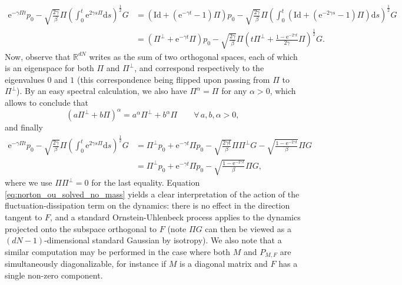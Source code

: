 \documentclass[a4paper,10pt,twoside,leqno]{report}
\newcommand{\R}{\mathbb{R}}
\newcommand{\Id}{\mathrm{Id}}
\newcommand{\dif}{\mathrm{d}}
\newcommand{\1}{\mathbbm{1}}
\newcommand{\e}{\mathrm{e}}
\begin{document}
    \begin{equation}
        \begin{aligned}
            \mathrm{e}^{-\gamma \Pi t}p_0-\sqrt{\frac{2\gamma}{\beta}} \Pi\left(\int_0^t\e^{2\gamma s \Pi }\dif s\right)^{\frac12}G&=\left(\Id+\left(\e^{-\gamma t}-1\right)\Pi\right)p_0-\sqrt{\frac{2\gamma}{\beta}}\Pi\left(\int_0^t\left(\Id+\left(\e^{-2\gamma s}-1\right)\Pi\right)\dif s\right)^\frac{1}{2}G\\
            &=\left(\Pi^\perp +\e^{-\gamma t}\Pi\right)p_0-\sqrt{\frac{2\gamma}{\beta}}\Pi\left(t\Pi^\perp+\frac{1-\e^{-2\gamma t}}{2\gamma}\Pi\right)^{\frac 12}G.
        \end{aligned}
    \end{equation}
    Now, observe that $\R^{dN}$ writes as the sum of two orthogonal spaces, each of which is an eigenspace for both $\Pi$ and $\Pi^\perp$, and correspond respectively to the eigenvalues $0$ and $1$ (this correspondence being flipped upon passing from $\Pi$ to $\Pi^\perp$). By an easy spectral calculation, we also have $\Pi^\alpha=\Pi$ for any $\alpha>0$,
    which allows to conclude that 
    \[(a\Pi^\perp+b\Pi)^\alpha=a^\alpha\Pi^\perp+b^\alpha\Pi\qquad \forall\,a,b,\alpha>0,\]
    and finally
    \begin{equation}
        \label{eq:norton_ou_solved_no_mass}
        \begin{aligned}
        \mathrm{e}^{-\gamma \Pi t}p_0-\sqrt{\frac{2\gamma}{\beta}} \Pi\left(\int_0^t\e^{2\gamma s \Pi }\dif s\right)^{\frac12}G&=\Pi^\perp p_0+\e^{-\gamma t}\Pi p_0-\sqrt{\frac{2\gamma t}{\beta}}\Pi\Pi^\perp G-\sqrt{\frac{1-\e^{-2\gamma t}}{\beta}}\Pi G\\
        &=\Pi^\perp p_0+\e^{-\gamma t}\Pi p_0-\sqrt{\frac{1-\e^{-2\gamma t}}{\beta}}\Pi G,
        \end{aligned}
    \end{equation}
    where we use $\Pi\Pi^\perp=0$ for the last equality.
    Equation \eqref{eq:norton_ou_solved_no_mass} yields a clear interpretation of the action of the fluctuation-dissipation term on the dynamics: there is no effect in the direction tangent to $F$, and a standard Ornstein-Uhlenbeck process applies to the dynamics projected onto the subspace orthogonal to $F$ (note $\Pi G$ can then be viewed as a $(dN-1)$-dimensional standard Gaussian by isotropy).
    We also note that a similar computation may be performed in the case where both $M$ and $P_{M,F}$ are simultaneously diagonalizable, for instance if $M$ is a diagonal matrix and $F$ has a single non-zero component.
    
\end{document}
